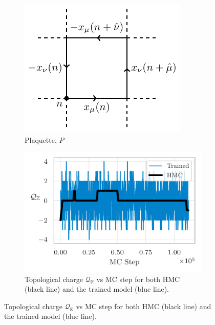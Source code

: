 \documentclass{article} %
\begin{document}
\begin{figure}[htpb]
   \centering
   \begin{subfigure}{0.22\textwidth}
      \includegraphics[width=\textwidth]{figures/plaq_tikz.pdf}
      \caption{\label{fig:plaquette}Plaquette, \(P\)}
   \end{subfigure}
   \hfill
   \begin{subfigure}{0.37\textwidth}
      \includegraphics[width=\textwidth]{figures/topological_freezing_anl_blue2.pdf}
      \caption{\label{fig:topological_freezing}Topological charge \(\mathcal{Q}_{\mathbb{R}}\) vs MC
      step for both HMC (black line) and the trained model (blue line).}%

\end{subfigure}
\end{figure}
\end{document}
